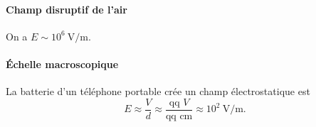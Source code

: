         \paragraph{Champ disruptif de l'air}

            On a $E\sim 10^{6}~\si{\volt\per\metre}$.

        \paragraph{Échelle macroscopique}

            La batterie d'un téléphone portable crée un champ électrostatique est
            \begin{equation*}
                E\approx \frac{V}{d}\approx \frac{\text{qq } V}{\text{qq } \si{\centi\metre}}\approx10^{2}~\si{\volt\per\metre}.
            \end{equation*}